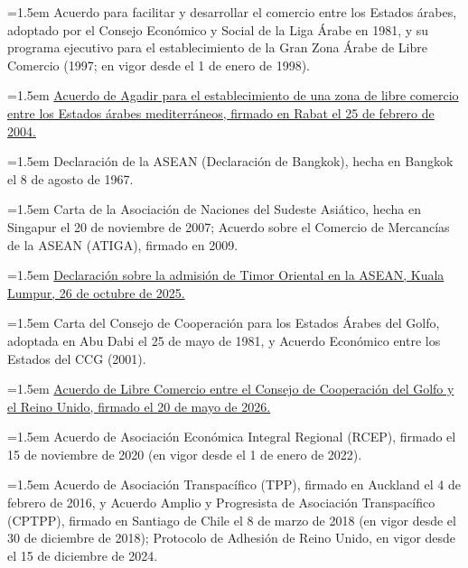 \documentclass[10pt,a4paper]{article}
\begin{document}
\noindent\hangindent=1.5em Acuerdo para facilitar y desarrollar el comercio entre los Estados árabes, adoptado por el Consejo Económico y Social de la Liga Árabe en 1981, y su programa ejecutivo para el establecimiento de la Gran Zona Árabe de Libre Comercio (1997; en vigor desde el 1 de enero de 1998).

\noindent\hangindent=1.5em \href{https://english.ahram.org.eg/NewsContent/3/12/198621/Business/Economy/Lebanon,-Palestine-join-Agadir-free-trade-agreemen.aspx}{Acuerdo de Agadir para el establecimiento de una zona de libre comercio entre los Estados árabes mediterráneos, firmado en Rabat el 25 de febrero de 2004.}

\noindent\hangindent=1.5em Declaración de la ASEAN (Declaración de Bangkok), hecha en Bangkok el 8 de agosto de 1967.

\noindent\hangindent=1.5em Carta de la Asociación de Naciones del Sudeste Asiático, hecha en Singapur el 20 de noviembre de 2007; Acuerdo sobre el Comercio de Mercancías de la ASEAN (ATIGA), firmado en 2009.

\noindent\hangindent=1.5em \href{https://www.malaymail.com/news/malaysia/2025/10/27/historic-day-for-asean-timor-leste-joins-bloc-malaysia-brokers-peace-between-thailand-and-cambodia/196011}{Declaración sobre la admisión de Timor Oriental en la ASEAN, Kuala Lumpur, 26 de octubre de 2025.}

\noindent\hangindent=1.5em Carta del Consejo de Cooperación para los Estados Árabes del Golfo, adoptada en Abu Dabi el 25 de mayo de 1981, y Acuerdo Económico entre los Estados del CCG (2001).

\noindent\hangindent=1.5em \href{https://gulfbusiness.com/en/2026/trade/gcc-uk-free-trade-deal-regional-instability-economic-ties/}{Acuerdo de Libre Comercio entre el Consejo de Cooperación del Golfo y el Reino Unido, firmado el 20 de mayo de 2026.}

\noindent\hangindent=1.5em Acuerdo de Asociación Económica Integral Regional (RCEP), firmado el 15 de noviembre de 2020 (en vigor desde el 1 de enero de 2022).

\noindent\hangindent=1.5em Acuerdo de Asociación Transpacífico (TPP), firmado en Auckland el 4 de febrero de 2016, y Acuerdo Amplio y Progresista de Asociación Transpacífico (CPTPP), firmado en Santiago de Chile el 8 de marzo de 2018 (en vigor desde el 30 de diciembre de 2018); Protocolo de Adhesión de Reino Unido, en vigor desde el 15 de diciembre de 2024.
\end{document}
